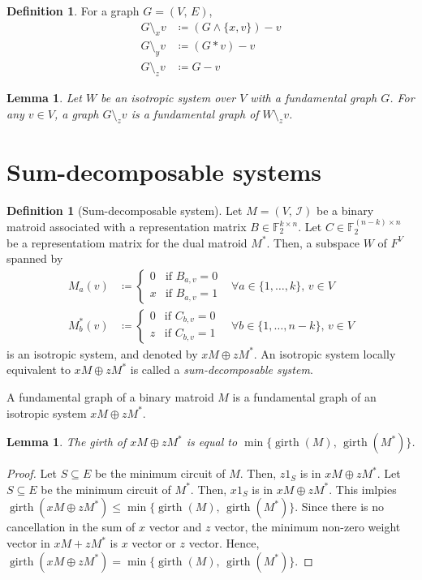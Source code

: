 \documentclass[twoside,10pt]{article}
\DeclareMathOperator{\girth}{girth}
\newtheorem{lemma}[theorem]{Lemma}
\theoremstyle{definition}
\newtheorem{definition}[theorem]{Definition}
\theoremstyle{remark}
\begin{document}
\begin{definition}
For a graph $G=(V,\,E)$,
\begin{align*}
G\setminus_x v &\coloneqq (G\wedge \{x,v\})-v\\
G\setminus_y v &\coloneqq (G*v) - v\\
G\setminus_z v &\coloneqq G - v
\end{align*}
\end{definition}

\begin{lemma}
Let $W$ be an isotropic system over $V$ with a fundamental graph $G$.
For any $v\in V$, a graph $G\setminus_z v$ is a fundamental graph of $W\setminus_z v$.
\end{lemma}

\section{Sum-decomposable systems}

\begin{definition}[Sum-decomposable system]
Let $M=(V,\,\mathcal{I})$ be a binary matroid associated with a representation matrix $B\in\mathbb{F}_2^{k\times n}$.
Let $C\in\mathbb{F}_2^{(n-k)\times n}$ be a representatiom matrix for the dual matroid $M^*$.
Then, a subspace $W$ of $F^V$ spanned by
\begin{align*}
M_a(v)&\coloneqq \begin{cases}
0&\text{if } B_{a, v} = 0\\
x&\text{if } B_{a, v} = 1
\end{cases}&\forall a\in\{1,\dotsc,k\},\,v\in V\\
M^*_b(v)&\coloneqq \begin{cases}
0&\text{if } C_{b, v} = 0\\
z&\text{if } C_{b, v} = 1
\end{cases}&\forall b\in\{1,\dotsc,n-k\},\,v\in V
\end{align*}
is an isotropic system, and denoted by $xM\oplus zM^*$.
An isotropic system locally equivalent to $xM\oplus zM^*$ is called a \textit{sum-decomposable system}.
\end{definition}

A fundamental graph of a binary matroid $M$ is a fundamental graph of an isotropic system $xM\oplus zM^*$.

\begin{lemma}
The girth of $xM\oplus zM^*$ is equal to $\min\{\girth(M),\,\girth(M^*)\}$.
\end{lemma}
\begin{proof}
Let $S\subseteq E$ be the minimum circuit of $M$.
Then, $z1_S$ is in $xM\oplus zM^*$.
Let $S\subseteq E$ be the minimum circuit of $M^*$.
Then, $x1_S$ is in $xM\oplus zM^*$.
This imlpies $\girth(xM\oplus zM^*)\le \min\{\girth(M),\,\girth(M^*)\}$.
Since there is no cancellation in the sum of $x$ vector and $z$ vector, the minimum non-zero weight vector in $xM+zM^*$ is $x$ vector or $z$ vector.
Hence, $\girth(xM\oplus zM^*)= \min\{\girth(M),\,\girth(M^*)\}$.
\end{proof}
\end{document}
